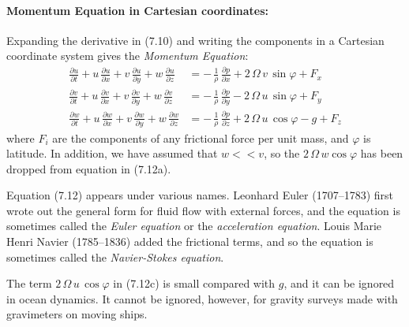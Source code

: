 \paragraph{Momentum Equation in Cartesian coordinates:}
Expanding the
derivative in (7.10) and writing the components in a Cartesian
coordinate system gives the \textit{Momentum Equation}:
\begin{subequations}
\begin{align}
\frac{\partial{u}}{\partial{t}} + u\,\frac{\partial{u}}{\partial{x}}
+ v\,\frac{\partial{u}}{\partial{y}} +w\,\frac{\partial{u}}{\partial{z}} &=
-\,\frac{1}{\rho}\,\frac{\partial{p}}{\partial{x}} +
2\,\Omega\,{v}\,\sin\varphi +  F_x \\
 \frac{\partial{v}}{\partial{t}} + u\,\frac{\partial{v}}{\partial{x}} +
v\,\frac{\partial{v}}{\partial{y}} +w\,\frac{\partial{v}}{\partial{z}} &=
-\,\frac{1}{\rho}\,\frac{\partial{p}}{\partial{y}} - 2\,\Omega\,u\,\sin\varphi
+ F_y
\\
 \frac{\partial{w}}{\partial{t}} + u\,\frac{\partial{w}}{\partial{x}} +
v\,\frac{\partial{w}}{\partial{y}} +w\,\frac{\partial{w}}{\partial{z}} &=
-\,\frac{1}{\rho}\,\frac{\partial{p}}{\partial{z}} + 2\,\Omega\,{u}\,\cos\varphi
- g + F_z
\end{align}
\end{subequations}
where $F_i$ are the components of any frictional force per unit mass,
and $\varphi$ is latitude. In addition, we have assumed that $w << v$,
so the $2\,\Omega\,w \cos \varphi$ has been dropped from equation in
(7.12a).

Equation (7.12) appears under various names. Leonhard Euler
(1707--1783) first wrote out the general form for fluid flow with
external forces, and the equation is sometimes called the
\textit{Euler equation} or the
\textit{acceleration equation}. Louis
Marie Henri Navier (1785--1836) added the frictional terms, and so the
equation is sometimes called the \textit{Navier-Stokes
  equation}.

The term $2\,\Omega\,u\, \cos{\varphi}$ in (7.12c) is small compared
with $g$, and it can be ignored in ocean dynamics. It cannot be
ignored, however, for gravity surveys made with gravimeters on moving
ships.

